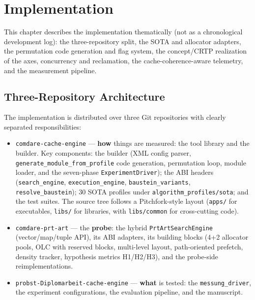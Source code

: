 \chapter{Implementation}\label{ch:impl}

This chapter describes the implementation thematically (not as a chronological development log): the
three-repository split, the SOTA and allocator adapters, the permutation code generation and flag
system, the concept/CRTP realization of the axes, concurrency and reclamation, the
cache-coherence-aware telemetry, and the measurement pipeline.

\section{Three-Repository Architecture}\label{sec:repos}

The implementation is distributed over three Git repositories with clearly separated
responsibilities:

\begin{itemize}
  \item \texttt{comdare-cache-engine} --- \textbf{how} things are measured: the tool library and the
  builder. Key components: the builder (XML config parser, \texttt{generate\_module\_from\_profile}
  code generation, permutation loop, module loader, and the seven-phase \texttt{ExperimentDriver});
  the ABI headers (\texttt{search\_engine}, \texttt{execution\_engine}, \texttt{baustein\_variants},
  \texttt{resolve\_baustein}); 30 SOTA profiles under \texttt{algorithm\_profiles/sota}; and the
  test suites. The source tree follows a Pitchfork-style layout (\texttt{apps/} for executables,
  \texttt{libs/} for libraries, with \texttt{libs/common} for cross-cutting code).
  \item \texttt{comdare-prt-art} --- the \textbf{probe}: the hybrid \texttt{PrtArtSearchEngine}
  (vector/map/tuple API), its ABI adapters, its building blocks (4+2 allocator pools, OLC with
  reserved blocks, multi-level layout, path-oriented prefetch, density tracker, hypothesis metrics
  H1/H2/H3), and the probe-side reimplementations.
  \item \texttt{probst-Diplomarbeit-cache-engine} --- \textbf{what} is tested: the
  \texttt{messung\_driver}, the experiment configurations, the evaluation pipeline, and the
  manuscript.
\end{itemize}

